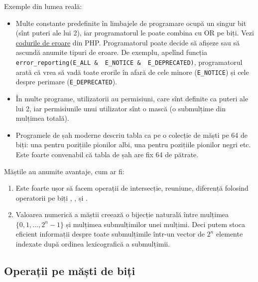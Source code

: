 Exemple din lumea reală:

\begin{itemize}
  \item Multe constante predefinite în limbajele de programare ocupă un singur bit (sînt puteri ale lui 2), iar programatorul le poate combina cu OR pe biți. Vezi \href{https://www.php.net/manual/en/errorfunc.constants.php}{codurile de eroare} din PHP. Programatorul poate decide să afișeze sau să ascundă anumite tipuri de eroare. De exemplu, apelînd funcția \texttt{error_reporting(E_ALL & ~E_NOTICE & ~E_DEPRECATED)}, programatorul arată că vrea să vadă toate erorile în afară de cele minore (\texttt{E_NOTICE}) și cele despre perimare (\texttt{E_DEPRECATED}).

  \item În multe programe, utilizatorii au permisiuni, care sînt definite ca puteri ale lui 2, iar permisiunile unui utilizator sînt o mască (o submulțime din mulțimea totală).

  \item Programele de șah moderne descriu tabla ca pe o colecție de măști pe 64 de biți: una pentru pozițiile pionilor albi, una pentru pozițiile pionilor negri etc. Este foarte convenabil că tabla de șah are fix 64 de pătrate.
\end{itemize}

Măștile au anumite avantaje, cum ar fi:

\begin{enumerate}
  \item Este foarte ușor să facem operații de intersecție, reuniune, diferență folosind operatorii pe biți \ccode{&}, \ccode{|}, \ccode{^} și \ccode{~}.

  \item Valoarea numerică a măștii creează o bijecție naturală între mulțimea $\{0, 1, \dots, 2^n - 1\}$ și mulțimea submulțimilor unei mulțimi. Deci putem stoca eficient informații despre toate submulțimile într-un vector de $2^n$ elemente indexate după ordinea lexicografică a submulțimii.
\end{enumerate}

\subsection{Operații pe măști de biți}

